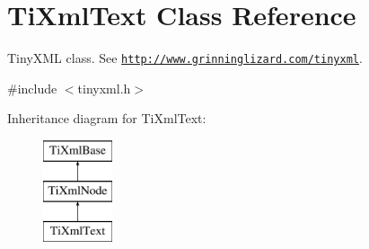\hypertarget{class_ti_xml_text}{}\section{Ti\+Xml\+Text Class Reference}
\label{class_ti_xml_text}


Tiny\+X\+ML class. See \href{http://www.grinninglizard.com/tinyxml}{\tt http\+://www.\+grinninglizard.\+com/tinyxml}.  




{\ttfamily \#include $<$tinyxml.\+h$>$}

Inheritance diagram for Ti\+Xml\+Text\+:\begin{figure}[H]
\begin{center}
\leavevmode
\includegraphics[height=3.000000cm]{class_ti_xml_text}
\end{center}
\end{figure}
